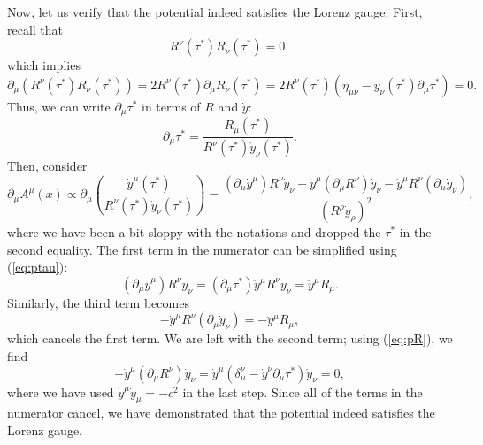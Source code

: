 Now, let us verify that the potential indeed satisfies the Lorenz gauge. First, recall that 
\begin{equation}
    R^\nu(\tau^*)R_\nu(\tau^*) = 0,
\end{equation}
which implies 
\begin{equation}
    \partial_\mu\left(R^\nu(\tau^*)R_\nu(\tau^*)\right) = 2R^\nu(\tau^*)\partial_\mu R_\nu(\tau^*) = 2R^\nu(\tau^*)(\eta_{\mu\nu} - \dot{y}_\nu(\tau^*)\partial_\mu\tau^*)=0.
    \label{eq:pR}
\end{equation}
Thus, we can write $\partial_\mu\tau^*$ in terms of $R$ and $\dot{y}$:
\begin{equation}
    \partial_\mu\tau^* = \frac{R_\mu(\tau^*)}{R^\nu(\tau^*)\dot{y}_\nu(\tau^*)}.
    \label{eq:ptau}
\end{equation}
Then, consider
\begin{equation}
    \partial_\mu A^\mu(x) \propto \partial_\mu\left(\frac{\dot{y}^\mu(\tau^*)}{R^\nu(\tau^*)\dot{y}_\nu(\tau^*)}\right) = \frac{(\partial_\mu \dot{y}^\mu)R^\nu\dot{y}_\nu -  \dot{y}^\mu(\partial_\mu R^\nu)\dot{y}_\nu -  \dot{y}^\mu R^\nu(\partial_\mu\dot{y}_\nu)}{(R^\rho\dot{y}_\rho)^2},
\end{equation}
where we have been a bit sloppy with the notations and dropped the $\tau^*$ in the second equality. The first term in the numerator can be simplified using (\ref{eq:ptau}):
\begin{equation}
    (\partial_\mu \dot{y}^\mu)R^\nu\dot{y}_\nu = (\partial_\mu\tau^*)\ddot{y}^\mu R^\nu\dot{y}_\nu = \ddot{y}^\mu R_\mu.
\end{equation}
Similarly, the third term becomes
\begin{equation}
    -\dot{y}^\mu R^\nu(\partial_\mu\dot{y}_\nu) = - \ddot{y}^\mu R_\mu,
\end{equation}
which cancels the first term. We are left with the second term; using (\ref{eq:pR}), we find
\begin{equation}
    -\dot{y}^\mu(\partial_\mu R^\nu)\dot{y}_\nu= \dot{y}^\mu(\delta_\mu^\nu - \dot{y}^\nu\partial_\mu\tau^*)\dot{y}_\nu = 0,
\end{equation}
where we have used $\dot{y}^\mu\dot{y}_\mu = -c^2$ in the last step. Since all of the terms in the numerator cancel, we have demonstrated that the potential indeed satisfies the Lorenz gauge.

